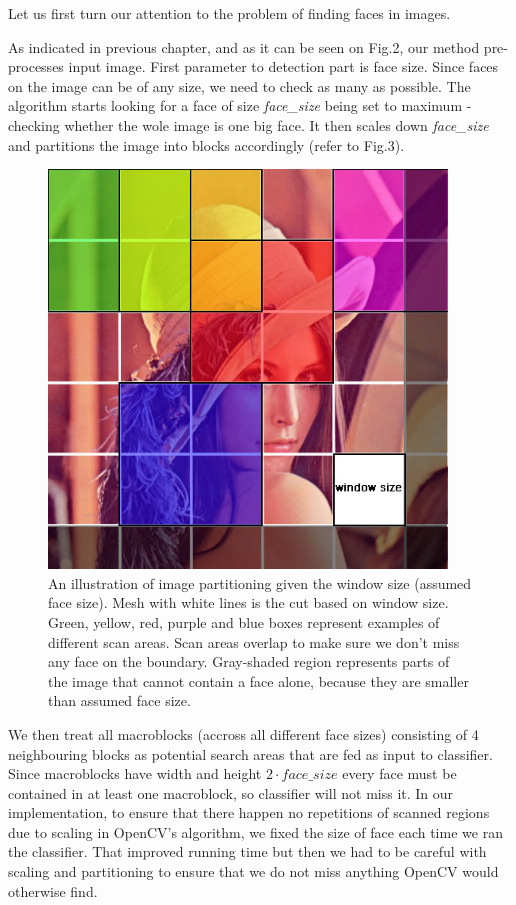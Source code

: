 \documentclass[11pt, draftclsnofoot, onecolumn]{IEEEtran}
\begin{document}
Let us first turn our attention to the problem of finding faces in images.

As indicated in previous chapter, and as it can be seen on Fig.2, our method pre-processes input image. First parameter to detection part is face size. Since faces on the image can be of any size, we need to check as many as possible. The algorithm starts looking for a face of size \emph{face\_size} being set to maximum - checking whether the wole image is one big face. It then scales down \emph{face\_size} and partitions the image into blocks accordingly (refer to Fig.3).

\begin{figure}[t!]
\centering
\includegraphics[width=300pt, height=300pt]{img1}
\caption{An illustration of image partitioning given the window size (assumed face size). Mesh with white lines is the cut based on window size. Green, yellow, red, purple and blue boxes represent examples of different scan areas. Scan areas overlap to make sure we don't miss any face on the boundary. Gray-shaded region represents parts of the image that cannot contain a face alone, because they are smaller than assumed face size.}
\end{figure}

We then treat all macroblocks (accross all different face sizes) consisting of 4 neighbouring blocks as potential search areas that are fed as input to classifier. Since macroblocks have width and height $2 \cdot face\_size$ every face must be contained in at least one macroblock, so classifier will not miss it. In our implementation, to ensure that there happen no repetitions of scanned regions due to scaling in OpenCV's algorithm, we fixed the size of face each time we ran the classifier. That improved running time but then we had to be careful with scaling and partitioning to ensure that we do not miss anything OpenCV would otherwise find.
\end{document}
